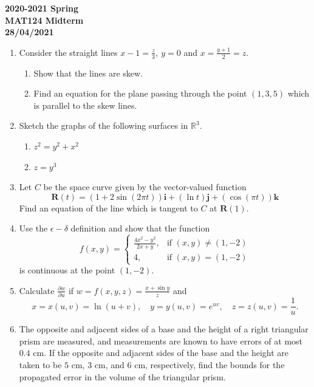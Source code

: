\documentclass[a4paper, 12pt]{article}
\begin{document}
\pagestyle{empty}

\begin{center}
\textbf{2020-2021 Spring \\MAT124 Midterm\\28/04/2021}
\end{center}

\begin{enumerate}[leftmargin=*,label=\textbf{\arabic*.}]
\item Consider the straight lines $\displaystyle x-1=\frac z3,\: y=0$ and $\displaystyle x=\frac{y+1}2=z$.

\begin{enumerate}[leftmargin=*,label=\textbf{\alph*.}]
\item Show that the lines are skew.
\item  Find an equation for the plane passing through the point $(1,3,5)$ which is parallel to the skew lines.
\end{enumerate}

\item Sketch the graphs of the following surfaces in $\mathbb{R}^3$.

\begin{enumerate}[leftmargin=*,label=\textbf{\alph*.}]
\item $z^2=y^2+x^2$
\item $z=y^3$
\end{enumerate}

\item Let $C$ be the space curve given by the vector-valued function
\[\mathbf{R}(t)=(1+2\sin(2\pi t))\mathbf{i}+(\ln t)\mathbf{j}+(\cos(\pi t))\mathbf{k}\]
Find an equation of the line which is tangent to $C$ at $\mathbf{R}(1)$.

\item Use the $\epsilon-\delta$ definition and show that the function
\[f(x,y)=\left\{\begin{array}{cl}
\displaystyle\frac{4x^2-y^2}{2x+y},& \text{if }(x,y)\neq(1,-2)\\[1em]
4,&\text{if }(x,y)=(1,-2)
\end{array}\right.\]
is continuous at the point $(1,-2)$.

\item Calculate $\displaystyle\frac{\partial w}{\partial u}$ if $\displaystyle w=f(x,y,z)=\frac{x+\sin y}z$ and
\[x=x(u,v)=\ln(u+v),\quad y=y(u,v)={e}^{uv},\quad z=z(u,v)=\frac1u.\]

\item The opposite and adjacent sides of a base and the height of a right triangular prism are measured, and measurements are known to have errors of at most $0.4$ cm. If the opposite and adjacent sides of the base and the height are taken to be $5$ cm, $3$ cm, and $6$ cm, respectively, find the bounds for the propagated error in the volume of the triangular prism.


\end{enumerate}
\end{document}
